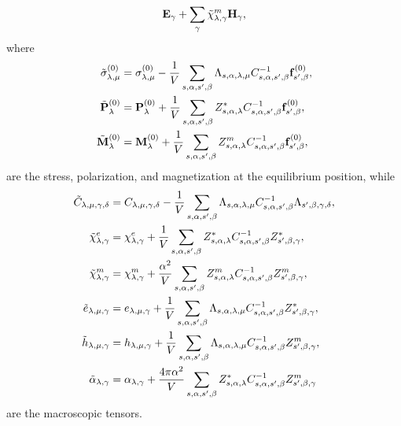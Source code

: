 \documentclass[12pt,a4paper,twoside]{report}
\begin{document}
{\begin{align}
{\bf E}_{\gamma}
+\sum_{\gamma} 
\tilde \chi^m_{\lambda,\gamma}
{\bf H}_{\gamma},
\end{align}
where 
\begin{align}
\tilde \sigma^{(0)}_{\lambda,\mu}&= \sigma^{(0)}_{\lambda,\mu}
-{1\over V} \sum_{s,\alpha,s',\beta} \Lambda_{s,\alpha,\lambda,\mu}
C^{-1}_{s,\alpha,s',\beta} {\bf f}^{(0)}_{s',\beta}, \\
\tilde {\bf P}^{(0)}_\lambda&= {\bf P}^{(0)}_\lambda +{1\over V}
\sum_{s,\alpha,s',\beta} Z^*_{s,\alpha,\lambda} C^{-1}_{s,\alpha,s',\beta}
{\bf f}^{(0)}_{s',\beta}, \\
\tilde {\bf M}^{(0)}_\lambda&= {\bf M}^{(0)}_\lambda +{1\over V}
\sum_{s,\alpha,s',\beta} Z^m_{s,\alpha,\lambda} C^{-1}_{s,\alpha,s',\beta}
{\bf f}^{(0)}_{s',\beta},
\end{align}
are the stress, polarization, and magnetization at the equilibrium position,
while
\begin{align}
\tilde C_{\lambda,\mu,\gamma,\delta}&= C_{\lambda,\mu,\gamma,\delta}
-{1\over V}\sum_{s,\alpha,s',\beta} \Lambda_{s,\alpha,\lambda,\mu}
C^{-1}_{s,\alpha,s',\beta}  \Lambda_{s',\beta,\gamma,\delta},\\
\tilde \chi^e_{\lambda,\gamma}&= \chi^e_{\lambda,\gamma} 
+{1 \over V} \sum_{s,\alpha,s',\beta} Z^*_{s,\alpha,\lambda}
C^{-1}_{s,\alpha,s',\beta}  Z^*_{s',\beta,\gamma},\\
\tilde \chi^m_{\lambda,\gamma}&= \chi^m_{\lambda,\gamma} 
+{\alpha^2 \over V} \sum_{s,\alpha,s',\beta} Z^m_{s,\alpha,\lambda}
C^{-1}_{s,\alpha,s',\beta}  Z^m_{s',\beta,\gamma}, \\
\tilde e_{\lambda,\mu,\gamma}&= e_{\lambda,\mu,\gamma}
+{1\over V}\sum_{s,\alpha,s',\beta} \Lambda_{s,\alpha,\lambda,\mu}
C^{-1}_{s,\alpha,s',\beta} Z^*_{s',\beta,\gamma},\\
\tilde h_{\lambda,\mu,\gamma}&= h_{\lambda,\mu,\gamma}
+{1\over V}\sum_{s,\alpha,s',\beta} \Lambda_{s,\alpha,\lambda,\mu}
C^{-1}_{s,\alpha,s',\beta}  Z^m_{s',\beta,\gamma},\\
\tilde \alpha_{\lambda,\gamma}&= \alpha_{\lambda,\gamma}
+{4 \pi \alpha^2 \over V}\sum_{s,\alpha,s',\beta} Z^*_{s,\alpha,\lambda}
C^{-1}_{s,\alpha,s',\beta}  Z^m_{s',\beta,\gamma}
\end{align}
are the macroscopic tensors.
}
\\
\end{document}
